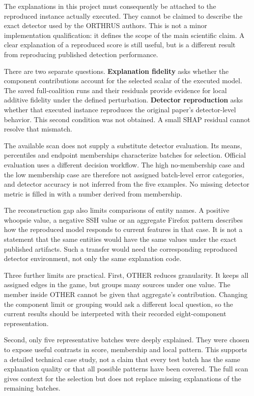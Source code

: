 \documentclass[11pt,a4paper]{article}
\begin{document}
The explanations in this project must consequently be attached to the
reproduced instance actually executed. They cannot be claimed to describe the
exact detector used by the ORTHRUS authors. This is not a minor implementation
qualification: it defines the scope of the main scientific claim. A clear
explanation of a reproduced score is still useful, but is a different result
from reproducing published detection performance.

There are two separate questions. \textbf{Explanation fidelity} asks whether
the component contributions account for the selected scalar of the executed
model. The saved full-coalition runs and their residuals provide evidence for
local additive fidelity under the defined perturbation. \textbf{Detector
reproduction} asks whether that executed instance reproduces the original
paper's detector-level behavior. This second condition was not obtained.
A small SHAP residual cannot resolve that mismatch.

The available scan does not supply a substitute detector evaluation. Its means,
percentiles and endpoint memberships characterize batches for selection.
Official evaluation uses a different decision workflow. The high no-membership case and the low membership case are therefore not
assigned batch-level error categories, and detector accuracy is not inferred
from the five examples.
No missing detector metric is filled in with a number derived from membership.

The reconstruction gap also limits comparisons of entity names. A positive
whoopsie value, a negative SSH value or an aggregate Firefox pattern describes
how the reproduced model responds to current features in that case. It is not
a statement that the same entities would have the same values under the exact
published artifacts. Such a transfer would need the corresponding reproduced
detector environment, not only the same explanation code.

Three further limits are practical. First, OTHER reduces granularity. It keeps
all assigned edges in the game, but groups many sources under one value. The
member inside OTHER cannot be given that aggregate's contribution. Changing
the component limit or grouping would ask a different local question, so the
current results should be interpreted with their recorded eight-component
representation.

Second, only five representative batches were deeply explained. They were
chosen to expose useful contrasts in score, membership and local pattern. This
supports a detailed technical case study, not a claim that every test batch has
the same explanation quality or that all possible patterns have been covered.
The full scan gives context for the selection but does not replace missing
explanations of the remaining batches.
\end{document}
